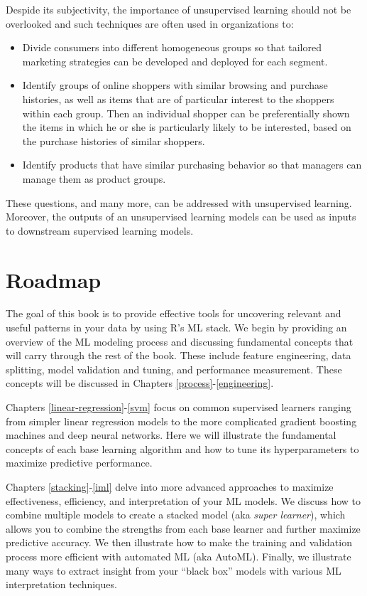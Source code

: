 \documentclass[]{krantz}
\providecommand{\tightlist}{%
  \setlength{\itemsep}{0pt}\setlength{\parskip}{0pt}}
\begin{document}
Despide its subjectivity, the importance of unsupervised learning should not be overlooked and such techniques are often used in organizations to:

\begin{itemize}
\tightlist
\item
  Divide consumers into different homogeneous groups so that tailored marketing strategies can be developed and deployed for each segment.
\item
  Identify groups of online shoppers with similar browsing and purchase histories, as well as items that are of particular interest to the shoppers within each group. Then an individual shopper can be preferentially shown the items in which he or she is particularly likely to be interested, based on the purchase histories of similar shoppers.
\item
  Identify products that have similar purchasing behavior so that managers can manage them as product groups.
\end{itemize}

These questions, and many more, can be addressed with unsupervised learning. Moreover, the outputs of an unsupervised learning models can be used as inputs to downstream supervised learning models.

\hypertarget{roadmap}{%
\section{Roadmap}\label{roadmap}}

The goal of this book is to provide effective tools for uncovering relevant and useful patterns in your data by using R's ML stack. We begin by providing an overview of the ML modeling process and discussing fundamental concepts that will carry through the rest of the book. These include feature engineering, data splitting, model validation and tuning, and performance measurement. These concepts will be discussed in Chapters \ref{process}-\ref{engineering}.

Chapters \ref{linear-regression}-\ref{svm} focus on common supervised learners ranging from simpler linear regression models to the more complicated gradient boosting machines and deep neural networks. Here we will illustrate the fundamental concepts of each base learning algorithm and how to tune its hyperparameters to maximize predictive performance.

Chapters \ref{stacking}-\ref{iml} delve into more advanced approaches to maximize effectiveness, efficiency, and interpretation of your ML models. We discuss how to combine multiple models to create a stacked model (aka \emph{super learner}), which allows you to combine the strengths from each base learner and further maximize predictive accuracy. We then illustrate how to make the training and validation process more efficient with automated ML (aka AutoML). Finally, we illustrate many ways to extract insight from your ``black box'' models with various ML interpretation techniques.
\end{document}
